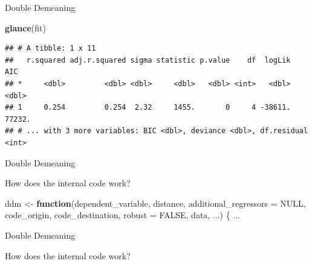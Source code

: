 \documentclass[ignorenonframetext,compress,aspectratio=169]{beamer}
\newenvironment{Shaded}{\begin{snugshade}}{\end{snugshade}}
\newcommand{\KeywordTok}[1]{\textcolor[rgb]{0.13,0.29,0.53}{\textbf{#1}}}
\newcommand{\DataTypeTok}[1]{\textcolor[rgb]{0.13,0.29,0.53}{#1}}
\newcommand{\StringTok}[1]{\textcolor[rgb]{0.31,0.60,0.02}{#1}}
\newcommand{\CommentTok}[1]{\textcolor[rgb]{0.56,0.35,0.01}{\textit{#1}}}
\newcommand{\OtherTok}[1]{\textcolor[rgb]{0.56,0.35,0.01}{#1}}
\newcommand{\ControlFlowTok}[1]{\textcolor[rgb]{0.13,0.29,0.53}{\textbf{#1}}}
\newcommand{\OperatorTok}[1]{\textcolor[rgb]{0.81,0.36,0.00}{\textbf{#1}}}
\newcommand{\NormalTok}[1]{#1}
\begin{document}
\begin{frame}[fragile]{Double Demeaning}

\begin{Shaded}
\begin{Highlighting}[]
\KeywordTok{glance}\NormalTok{(fit)}
\end{Highlighting}
\end{Shaded}

\begin{verbatim}
## # A tibble: 1 x 11
##   r.squared adj.r.squared sigma statistic p.value    df  logLik    AIC
## *     <dbl>         <dbl> <dbl>     <dbl>   <dbl> <int>   <dbl>  <dbl>
## 1     0.254         0.254  2.32     1455.       0     4 -38611. 77232.
## # ... with 3 more variables: BIC <dbl>, deviance <dbl>, df.residual <int>
\end{verbatim}

\end{frame}

\begin{frame}[fragile]{Double Demeaning}

How does the internal code work?

\begin{Shaded}
\begin{Highlighting}[]
\NormalTok{ddm <-}\StringTok{ }\ControlFlowTok{function}\NormalTok{(dependent_variable,}
\NormalTok{                distance,}
                \DataTypeTok{additional_regressors =} \OtherTok{NULL}\NormalTok{,}
\NormalTok{                code_origin,}
\NormalTok{                code_destination,}
                \DataTypeTok{robust =} \OtherTok{FALSE}\NormalTok{,}
\NormalTok{                data, ...) \{}
\NormalTok{...}
\end{Highlighting}
\end{Shaded}

\end{frame}

\begin{frame}[fragile]{Double Demeaning}

How does the internal code work?

\begin{Shaded}
\end{Shaded}

\end{frame}
\end{document}
